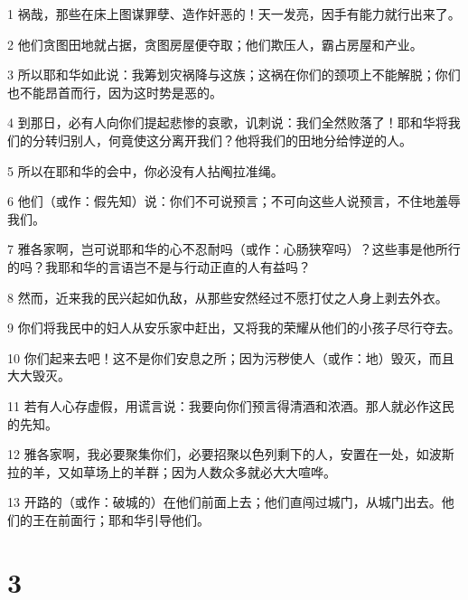 \par 1 祸哉，那些在床上图谋罪孽、造作奸恶的！天一发亮，因手有能力就行出来了。
\par 2 他们贪图田地就占据，贪图房屋便夺取；他们欺压人，霸占房屋和产业。
\par 3 所以耶和华如此说：我筹划灾祸降与这族；这祸在你们的颈项上不能解脱；你们也不能昂首而行，因为这时势是恶的。
\par 4 到那日，必有人向你们提起悲惨的哀歌，讥刺说：我们全然败落了！耶和华将我们的分转归别人，何竟使这分离开我们？他将我们的田地分给悖逆的人。
\par 5 所以在耶和华的会中，你必没有人拈阄拉准绳。
\par 6 他们（或作：假先知）说：你们不可说预言；不可向这些人说预言，不住地羞辱我们。
\par 7 雅各家啊，岂可说耶和华的心不忍耐吗（或作：心肠狭窄吗）？这些事是他所行的吗？我耶和华的言语岂不是与行动正直的人有益吗？
\par 8 然而，近来我的民兴起如仇敌，从那些安然经过不愿打仗之人身上剥去外衣。
\par 9 你们将我民中的妇人从安乐家中赶出，又将我的荣耀从他们的小孩子尽行夺去。
\par 10 你们起来去吧！这不是你们安息之所；因为污秽使人（或作：地）毁灭，而且大大毁灭。
\par 11 若有人心存虚假，用谎言说：我要向你们预言得清酒和浓酒。那人就必作这民的先知。
\par 12 雅各家啊，我必要聚集你们，必要招聚以色列剩下的人，安置在一处，如波斯拉的羊，又如草场上的羊群；因为人数众多就必大大喧哗。
\par 13 开路的（或作：破城的）在他们前面上去；他们直闯过城门，从城门出去。他们的王在前面行；耶和华引导他们。

\chapter{3}

